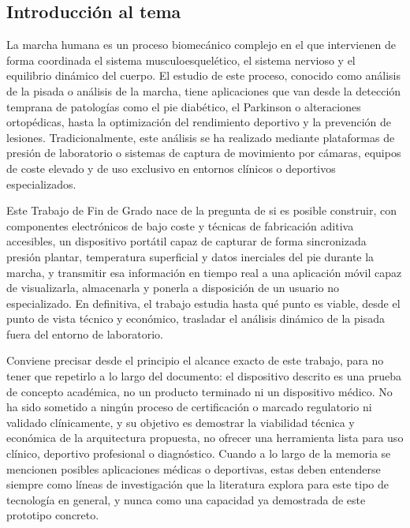 \begin{IAtext}

\section{Introducción al tema}

La marcha humana es un proceso biomecánico complejo en el que intervienen de forma coordinada el sistema musculoesquelético, el sistema nervioso y el equilibrio dinámico del cuerpo. El estudio de este proceso, conocido como análisis de la pisada o análisis de la marcha, tiene aplicaciones que van desde la detección temprana de patologías como el pie diabético, el Parkinson o alteraciones ortopédicas, hasta la optimización del rendimiento deportivo y la prevención de lesiones. Tradicionalmente, este análisis se ha realizado mediante plataformas de presión de laboratorio o sistemas de captura de movimiento por cámaras, equipos de coste elevado y de uso exclusivo en entornos clínicos o deportivos especializados.

Este Trabajo de Fin de Grado nace de la pregunta de si es posible construir, con componentes electrónicos de bajo coste y técnicas de fabricación aditiva accesibles, un dispositivo portátil capaz de capturar de forma sincronizada presión plantar, temperatura superficial y datos inerciales del pie durante la marcha, y transmitir esa información en tiempo real a una aplicación móvil capaz de visualizarla, almacenarla y ponerla a disposición de un usuario no especializado. En definitiva, el trabajo estudia hasta qué punto es viable, desde el punto de vista técnico y económico, trasladar el análisis dinámico de la pisada fuera del entorno de laboratorio.

Conviene precisar desde el principio el alcance exacto de este trabajo, para no tener que repetirlo a lo largo del documento: el dispositivo descrito es una prueba de concepto académica, no un producto terminado ni un dispositivo médico. No ha sido sometido a ningún proceso de certificación o marcado regulatorio ni validado clínicamente, y su objetivo es demostrar la viabilidad técnica y económica de la arquitectura propuesta, no ofrecer una herramienta lista para uso clínico, deportivo profesional o diagnóstico. Cuando a lo largo de la memoria se mencionen posibles aplicaciones médicas o deportivas, estas deben entenderse siempre como líneas de investigación que la literatura explora para este tipo de tecnología en general, y nunca como una capacidad ya demostrada de este prototipo concreto.


\end{IAtext}
